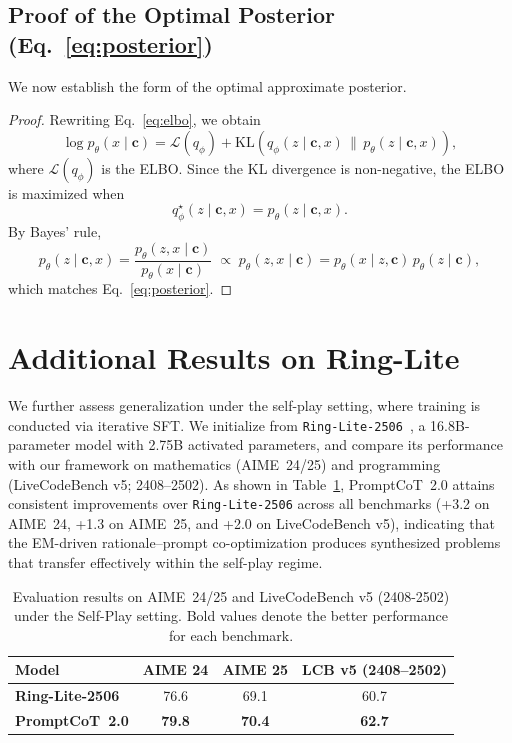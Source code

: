   \subsection{Proof of the Optimal Posterior (Eq.~\ref{eq:posterior})}
  We now establish the form of the optimal approximate posterior.
  
  \begin{proof}
  Rewriting Eq.~\ref{eq:elbo}, we obtain
  \[
  \log p_\theta(x \mid \mathbf{c})
  = \mathcal{L}(q_\phi) 
  + \mathrm{KL}\!\left(q_\phi(z \mid \mathbf{c}, x)\,\|\,p_\theta(z \mid \mathbf{c}, x)\right),
  \]
  where $\mathcal{L}(q_\phi)$ is the ELBO. Since the KL divergence is non-negative, the ELBO is maximized when
  \[
  q_\phi^\star(z \mid \mathbf{c}, x) = p_\theta(z \mid \mathbf{c}, x).
  \]
  By Bayes’ rule,
  \[
  p_\theta(z \mid \mathbf{c}, x) = \frac{p_\theta(z, x \mid \mathbf{c})}{p_\theta(x \mid \mathbf{c})}
  \;\propto\; p_\theta(z, x \mid \mathbf{c})
  = p_\theta(x \mid z, \mathbf{c}) \, p_\theta(z \mid \mathbf{c}),
  \]
  which matches Eq.~\ref{eq:posterior}.
  \end{proof}
  
  
  \section{Additional Results on Ring-Lite}
  \label{sec:ringlite}
  
  We further assess generalization under the self-play setting, where training is conducted via iterative SFT. We initialize from \texttt{Ring-Lite-2506}~\citep{team2025ring}, a 16.8B-parameter model with 2.75B activated parameters, and compare its performance with our framework on mathematics (AIME~24/25) and programming (LiveCodeBench v5; 2408–2502). As shown in Table~\ref{tab:ringlite}, PromptCoT~2.0 attains consistent improvements over \texttt{Ring-Lite-2506} across all benchmarks (+3.2 on AIME~24, +1.3 on AIME~25, and +2.0 on LiveCodeBench v5), indicating that the EM-driven rationale–prompt co-optimization produces synthesized problems that transfer effectively within the self-play regime.
  
  \begin{table}[h]
  \centering
  \small
  \begin{tabular}{lccc}
  \toprule
  \textbf{Model} & \textbf{AIME 24} & \textbf{AIME 25} & \textbf{LCB v5 (2408–2502)} \\
  \midrule
  \textbf{Ring-Lite-2506} & 76.6 & 69.1 & 60.7 \\
  \textbf{PromptCoT~2.0} & \textbf{79.8} & \textbf{70.4} & \textbf{62.7} \\
  \bottomrule
  \end{tabular}
  \caption{Evaluation results on AIME~24/25 and LiveCodeBench v5 (2408-2502) under the Self-Play setting. Bold values denote the better performance for each benchmark.}
  \label{tab:ringlite}
  \end{table}
  
